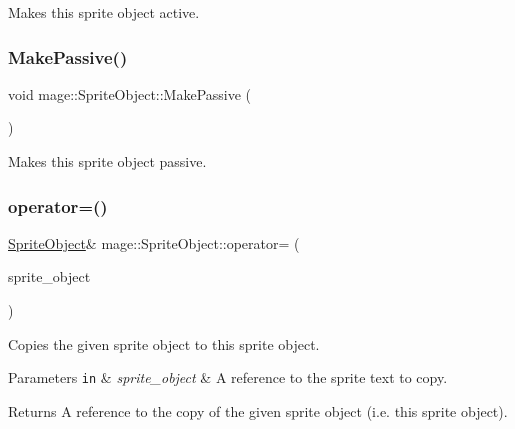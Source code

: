 Makes this sprite object active. \hypertarget{classmage_1_1_sprite_object_a0d778b381ab405ae5fc6a858d6d465e0}{}\label{classmage_1_1_sprite_object_a0d778b381ab405ae5fc6a858d6d465e0} 
\subsubsection{\texorpdfstring{Make\+Passive()}{MakePassive()}}
{\footnotesize\ttfamily void mage\+::\+Sprite\+Object\+::\+Make\+Passive (\begin{DoxyParamCaption}{ }\end{DoxyParamCaption})\hspace{0.3cm}{\ttfamily [noexcept]}}

Makes this sprite object passive. \hypertarget{classmage_1_1_sprite_object_ab24af642e7c49a13ca5526248f106b4e}{}\label{classmage_1_1_sprite_object_ab24af642e7c49a13ca5526248f106b4e} 
\subsubsection{\texorpdfstring{operator=()}{operator=()}\hspace{0.1cm}{\footnotesize\ttfamily [1/2]}}
{\footnotesize\ttfamily \hyperlink{classmage_1_1_sprite_object}{Sprite\+Object}\& mage\+::\+Sprite\+Object\+::operator= (\begin{DoxyParamCaption}\item[{const \hyperlink{classmage_1_1_sprite_object}{Sprite\+Object} \&}]{sprite\+\_\+object }\end{DoxyParamCaption})\hspace{0.3cm}{\ttfamily [delete]}}

Copies the given sprite object to this sprite object.


\begin{DoxyParams}[1]{Parameters}
\mbox{\tt in}  & {\em sprite\+\_\+object} & A reference to the sprite text to copy. \\
\hline
\end{DoxyParams}
\begin{DoxyReturn}{Returns}
A reference to the copy of the given sprite object (i.\+e. this sprite object). 
\end{DoxyReturn}
\hypertarget{classmage_1_1_sprite_object_a0d098954e6ef5b331b2b7e6f6cb3c21e}{}\label{classmage_1_1_sprite_object_a0d098954e6ef5b331b2b7e6f6cb3c21e} 
